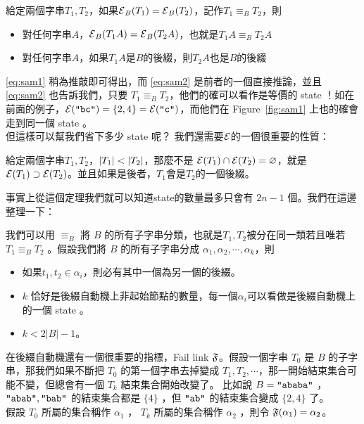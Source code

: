 \documentclass[a4paper,12pt]{book}
\begin{document}
\begin{theorem}[定理]
  給定兩個字串$T_1, T_2$，如果$\operatorname{\mathcal{E}}_B(T_1) = \operatorname{\mathcal{E}}_B(T_2)$，記作$T_1 \equiv_B T_2$，則
  \begin{itemize}
    \item 對任何字串$A$，$\operatorname{\mathcal{E}}_B(T_1 A) = \operatorname{\mathcal{E}}_B(T_2 A)$，也就是$T_1 A \equiv_B T_2 A$ \listeqn \label{eq:sam1}
    \item 對任何字串$A$，如果$T_1 A$是$B$的後綴，則$T_2 A$也是$B$的後綴 \listeqn \label{eq:sam2}
  \end{itemize}
\end{theorem}

\eqref{eq:sam1} 稍為推敲即可得出，而 \eqref{eq:sam2} 是前者的一個直接推論，並且 \eqref{eq:sam2} 也告訴我們，只要 $T_1 \equiv_B T_2$，他們的確可以看作是等價的 state ！如在前面的例子，$\operatorname{\mathcal{E}}(\texttt{"bc"}) = \{2, 4\} = \operatorname{\mathcal{E}}(\texttt{"c"})$，而他們在 Figure~\ref{fig:sam1} 上也的確會走到同一個 state 。\\
但這樣可以幫我們省下多少 state 呢？ 我們還需要$\operatorname{\mathcal{E}}$的一個很重要的性質：

\begin{theorem}[定理]
  給定兩個字串$T_1, T_2$，$\lvert T_1 \rvert < \lvert T_2 \rvert$，那麼不是
  $ \operatorname{\mathcal{E}}(T_1) \cap \operatorname{\mathcal{E}}(T_2) = \varnothing $，就是
  $ \operatorname{\mathcal{E}}(T_1) \supset \operatorname{\mathcal{E}}(T_2) $。並且如果是後者，$T_1$會是$T_2$的一個後綴。 \listeqn
\end{theorem} 
事實上從這個定理我們就可以知道state的數量最多只會有 $2n - 1$ 個。我們在這邊整理一下：\\

\begin{theorem}[定理]
  我們可以用 $\equiv_B$ 將 $B$ 的所有子字串分類，也就是$T_1, T_2$被分在同一類若且唯若 $T_1 \equiv_B T_2$ 。假設我們將 $B$ 的所有子字串分成 $\alpha_1, \alpha_2 , \cdots , \alpha_k$，則
  \begin{itemize}
    \item 如果$t_1, t_2 \in \alpha_i$，則必有其中一個為另一個的後綴。 \listeqn \label{eq:sam3}
    \item $k$ 恰好是後綴自動機上非起始節點的數量，每一個$\alpha_i$可以看做是後綴自動機上的一個 state 。
    \item $k < 2 |B| - 1$。
  \end{itemize}
\end{theorem}

在後綴自動機還有一個很重要的指標，Fail link $\operatorname{\mathfrak{F}}$。假設一個字串 $T_0$ 是 $B$ 的子字串，那我們如果不斷把 $T_0$ 的第一個字串去掉變成 $T_1, T_2, \cdots$，那一開始結束集合可能不變，但總會有一個 $T_k$ 結束集合開始改變了。 比如說 $B = \texttt{"ababa"}$ ， $\texttt{"abab"}, \texttt{"bab"}$ 的結束集合都是 $\{ 4 \}$ ，但 $\texttt{"ab"}$ 的結束集合變成 $\{ 2, 4 \}$ 了。\\
假設 $T_0$ 所屬的集合稱作 $\alpha_1$ ， $T_k$ 所屬的集合稱作 $\alpha_2$ ，則令 $\operatorname{\mathfrak{F}}(\alpha_1) = \alpha_2$。
\end{document}
